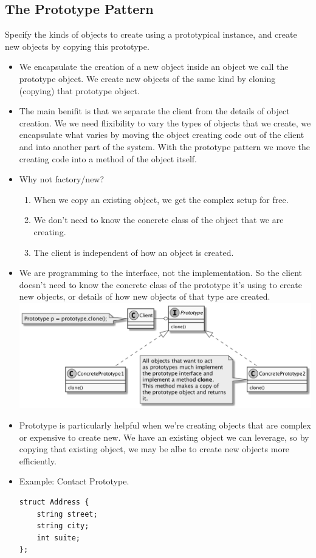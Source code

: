 \documentclass[11pt]{article}
\begin{document}
    \subsection{The Prototype Pattern}
    Specify the kinds of objects to create using a prototypical instance, and create new objects by copying this prototype.
    \begin{itemize}
        \item We encapsulate the creation of a new object inside an object we call the prototype object. We create new objects
        of the same kind by cloning (copying) that prototype object.
        \item The main benifit is that we separate the client from the details of object creation. We we need flixibility to
        vary the types of objects that we create, we encapsulate what varies by moving the object creating code out of the
        client and into another part of the system. With the prototype pattern we move the creating code into a method
        of the object itself.
        \item Why not factory/new?
            \begin{enumerate}
                \item When we copy an existing object, we get the complex setup for free.
                \item We don't need to know the concrete class of the object that we are creating.
                \item The client is independent of how an object is created.
            \end{enumerate}
        \item We are programming to the interface, not the implementation. So the client doesn't need to know the concrete
        class of the prototype it's using to create new objects, or details of how new objects of that type are created. \\
        \includegraphics[scale=0.2]{prototype/1__prototype}
        \item Prototype is particularly helpful when we're creating objects that are complex  or expensive to create new.
        We have an existing object we can leverage, so by copying that existing object, we may be albe to create new
        objects more efficiently.
        \item Example: Contact Prototype.
        \begin{multicols}{2}
            \begin{lstlisting}
struct Address {
    string street;
    string city;
    int suite;
};


\end{lstlisting}
\end{multicols}
\end{itemize}
\end{document}
